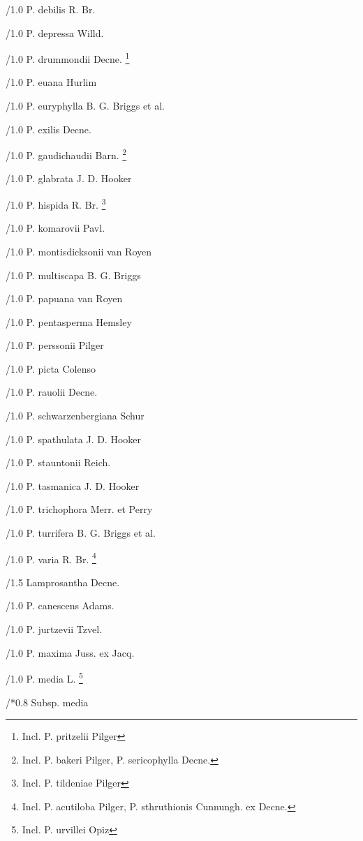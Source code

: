 \documentclass{article}
\begin{document}
\begin{classif}{1.0}
        /1.0 {P. debilis} R. Br.

        /1.0 {P. depressa} Willd.

        /1.0 {P. drummondii} Decne. \footnote{Incl. \KURN P.
        pritzelii Pilger}

        /1.0 {P. euana} Hurlim

        /1.0 {P. euryphylla} B. G. Briggs et al.

        /1.0 {P. exilis} Decne.

        /1.0 {P. gaudichaudii} Barn. \footnote{Incl. \KURN P.
        bakeri Pilger, \KURN P. sericophylla Decne.}

        /1.0 {P. glabrata} J. D. Hooker

        /1.0 {P. hispida} R. Br. \footnote{Incl. \KURN P.
        tildeniae Pilger}

        /1.0 {P. komarovii} Pavl.

        /1.0 {P. montisdicksonii} van Royen

        /1.0 {P. multiscapa} B. G. Briggs

        /1.0 {P. papuana} van Royen

        /1.0 {P. pentasperma} Hemsley

        /1.0 {P. perssonii} Pilger

        /1.0 {P. picta} Colenso

        /1.0 {P. rauolii} Decne.

        /1.0 {P. schwarzenbergiana} Schur

        /1.0 {P. spathulata} J. D. Hooker

        /1.0 {P. stauntonii} Reich.

        /1.0 {P. tasmanica} J. D. Hooker

        /1.0 {P. trichophora} Merr. et Perry

        /1.0 {P. turrifera} B. G. Briggs et al.

        /1.0 {P. varia} R. Br. \footnote{Incl. \KURN P.
        acutiloba Pilger, \KURN P. sthruthionis Cunnungh. ex
        Decne.}

/1.5 Lamprosantha Decne.

        /1.0 {P. canescens} Adams.

        /1.0 {P. jurtzevii} Tzvel.

        /1.0 {P. maxima} Juss. ex Jacq.

        /1.0 {P. media} L. \footnote{Incl. \KURN P. urvillei
        Opiz}

        /*0.8 {Subsp.} media


\end{classif}
\end{document}

